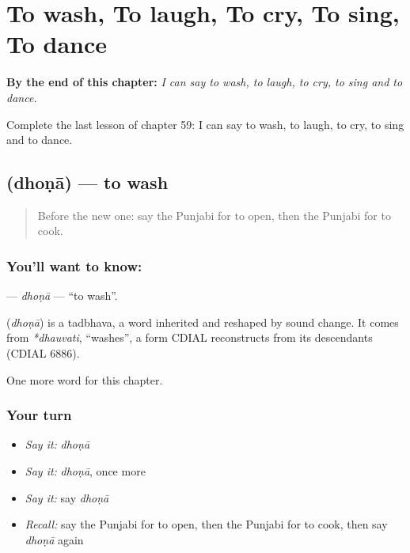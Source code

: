 
\chapter{To wash, To laugh, To cry, To sing, To dance}
\label{ch:pa-to-wash-to-laugh-to-cry-to-sing-to-dance}

\begin{chapteropening}
\textbf{By the end of this chapter:} \emph{I can say to wash, to laugh, to cry, to sing and to dance.}

Complete the last lesson of chapter 59: I can say to wash, to laugh, to cry, to sing and to dance.
\end{chapteropening}

\section[\texorpdfstring{\pa{ਧੋਣਾ} (dhoṇā)}{ਧੋਣਾ (dhoṇā)}]{ (dhoṇā) — to wash}

\label{lesson:PA-C59-dhona}



\begin{quote}
Before the new one: say the Punjabi for to open, then the Punjabi for to cook.
\end{quote}

\subsection*{You'll want to know: }
\textbf{} — \emph{dhoṇā} — \textquotedblleft{}to wash\textquotedblright{}.

\begin{cousinweb}
\textbf{} (\emph{dhoṇā}) is a tadbhava, a word inherited and reshaped by sound change. It comes from \emph{*dhauvati}, \textquotedblleft{}washes\textquotedblright{}, a form CDIAL reconstructs from its descendants (CDIAL 6886).
\end{cousinweb}

\begin{grammarlens}[title={What you've built}]
One more word for this chapter.
\end{grammarlens}

\subsection*{Your turn}
\begin{itemize}
\raggedright
  \item \emph{Say it:} \emph{dhoṇā}
  \item \emph{Say it:} \emph{dhoṇā}, once more
  \item \emph{Say it:} say \emph{dhoṇā}
  \item \emph{Recall:} say the Punjabi for to open, then the Punjabi for to cook, then say \emph{dhoṇā} again
\end{itemize}

